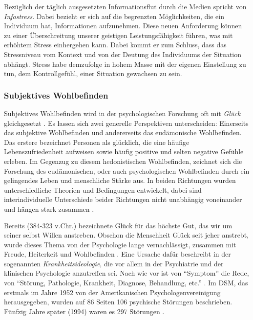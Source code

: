 Bezüglich der täglich ausgesetzten Informationsflut durch die Medien spricht  von \textit{Infostress}. Dabei bezieht er sich auf die begrenzten Möglichkeiten, die ein Individuum hat, Informationen aufzunehmen. Diese neuen Anforderung können zu einer Überschreitung unserer geistigen Leistungsfähigkeit führen, was mit erhöhtem Stress einhergehen kann. Dabei kommt er zum Schluss, dass das Stressniveau vom Kontext und von der Deutung des Individuums der Situation abhängt. Stress habe demzufolge in hohem Masse mit der eigenen Einstellung zu tun, dem Kontrollgefühl, einer Situation gewachsen zu sein.

\subsubsection{Subjektives Wohlbefinden}\label{sec:Swb}
Subjektives Wohlbefinden wird in der psychologischen Forschung oft mit \textit{Glück} gleichgesetzt \cite{Eid2014}. Es lassen sich zwei generelle Perspektiven unterscheiden: Einerseits das subjektive Wohlbefinden und andererseits das eudämonische Wohlbefinden. Das erstere bezeichnet Personen als glücklich, die eine häufige Lebenszufriedenheit aufweisen sowie häufig positive und selten negative Gefühle erleben. Im Gegenzug zu diesem hedonistischen Wohlbefinden, zeichnet sich die Forschung des eudämonischen, oder auch psychologischen Wohlbefinden durch ein gelingendes Leben und menschliche Stärke aus. In beiden Richtungen wurden unterschiedliche Theorien und Bedingungen entwickelt, dabei sind interindividuelle Unterschiede beider Richtungen nicht unabhängig voneinander und hängen stark zusammen \cite{Eid2014}.

Bereits  (384-323 v.Chr.) bezeichnete Glück für das höchste Gut, das wir um seiner selbst Willen anstreben. Obschon die Menschheit Glück seit jeher anstrebt, wurde dieses Thema von der Psychologie lange vernachlässigt, zusammen mit Freude, Heiterkeit und Wohlbefinden \cite{Tugade2014, Gruber2014}. Eine Ursache dafür beschreibt  in der sogenannten \textit{Krankheitsideologie}, die vor allem in der Psychiatrie und der klinischen Psychologie anzutreffen sei. Nach wie vor ist von \enquote{Symptom} die Rede, von \enquote{Störung, Pathologie, Krankheit, Diagnose, Behandlung, etc.} \cite[S.~14]{Maddux2005}. Im DSM, das erstmals im Jahre 1952 von der Amerikanischen Psychologenvereinigung herausgegeben, wurden auf 86 Seiten 106 psychische Störungen beschrieben. Fünfzig Jahre später (1994) waren es 297 Störungen \cite{Bucher2009}.

